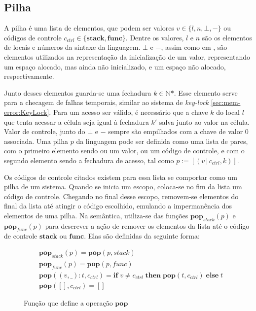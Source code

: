 \subsection{Pilha}

A pilha é uma lista de elementos, que podem ser valores $v \in \{l, n, \bot, -\}$ ou códigos de controle $c_{ctrl} \in \{\mathbf{stack},\mathbf{func}\}$. Dentre os valores, $l$ e $n$ são os elementos de locais e números da sintaxe da linguagem. $\bot$ e $-$, assim como em \citet{WESSEL2019}, são elementos utilizados na representação da inicialização de um valor, representando um espaço alocado, mas ainda não inicializado, e um espaço não alocado, respectivamente. 

Junto desses elementos guarda-se uma fechadura $k \in \mathbb{N}\text{*}$. Esse elemento serve para a checagem de falhas temporais, similar ao sistema de \emph{key-lock} \ref{sec:mem-error:KeyLock}. Para um acesso ser válido, é necessário que a chave $k$ do local $l$ que tenta acessar a célula seja igual à fechadura $k'$ salva junto ao valor na célula. Valor de controle, junto do $\bot$ e $-$ sempre são empilhados com a chave de valor 0 associada. Uma pilha $p$ da linguagem pode ser definida como uma lista de pares, com o primeiro elemento sendo ou um valor, ou um código de controle, e com o segundo elemento sendo a fechadura de acesso, tal como $p := [(v\,|\,c_{ctrl}, k)]$.

Os códigos de controle citados existem para essa lista se comportar como um pilha de um sistema. Quando se inicia um escopo, coloca-se no fim da lista um código de controle. Chegando no final desse escopo, removem-se elementos do final da lista até atingir o código escolhido, emulando a impermanência dos elementos de uma pilha. Na semântica, utiliza-se das funções $\mathbf{pop}_{stack}(p)$ e $\mathbf{pop}_{func}(p)$ para descrever a ação de remover os elementos da lista até o código de controle $\mathbf{stack}$ ou $\mathbf{func}$. Elas são definidas da seguinte forma:

\begin{figure}[ht]
	\begin{align}
		&\mathbf{pop}_{stack}(p) = \mathbf{pop}(p, stack) \label{fig:def:pop1}\\
		&\mathbf{pop}_{func}(p) = \mathbf{pop}(p, func) \label{fig:def:pop2}\\
		&\mathbf{pop}((v, \_) : t, c_{ctrl}) = \mathbf{if} \; v \neq c_{ctrl} \;\mathbf{then} \; \mathbf{pop}(t, c_{ctrl}) \; \mathbf{else} \; t  \label{fig:def:pop3}\\
		&\mathbf{pop}([], c_{ctrl}) =  [] \label{fig:def:pop4}
	\end{align}
	\caption{Função que define a operação $\mathbf{pop}$}
	\label{fig:def:pop}
\end{figure}

